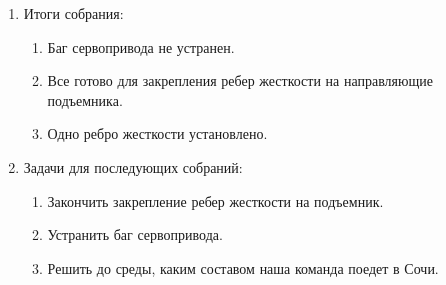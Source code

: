 \begin{enumerate}
\begin{enumerate}
    \end{enumerate}
    
	\item Итоги собрания: \newline
	\begin{enumerate}
	  \item Баг сервопривода не устранен.\newline
	  
      \item Все готово для закрепления ребер жесткости на направляющие подъемника.\newline
      
      \item Одно ребро жесткости установлено.\newline
      
    \end{enumerate}
    
	\item Задачи для последующих собраний:\newline
	\begin{enumerate}
	  \item Закончить закрепление ребер жесткости на подъемник.\newline
	  
	  \item Устранить баг сервопривода.\newline
	  
	  \item	Решить до среды, каким составом наша команда поедет в Сочи.\newline
	  
    \end{enumerate}     
\end{enumerate}

\fillpage
